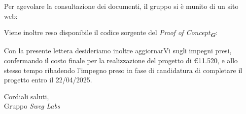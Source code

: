 Per agevolare la consultazione dei documenti, il gruppo si è munito di un sito web:
\begin{center}
\end{center}
Viene inoltre reso disponibile il codice sorgente del \emph{Proof of Concept}\textsubscript{\textit{\textbf{G}}}: 
\begin{center}
\end{center}
Con la presente lettera desideriamo inoltre aggiornarVi sugli impegni presi, confermando il costo finale per la realizzazione del progetto di \euro11.520, e allo stesso tempo ribadendo l’impegno preso in fase di candidatura di completare il progetto entro il 22/04/2025.\\
\vspace{1.5cm}

Cordiali saluti,\\
Gruppo \emph{Sweg Labs}

